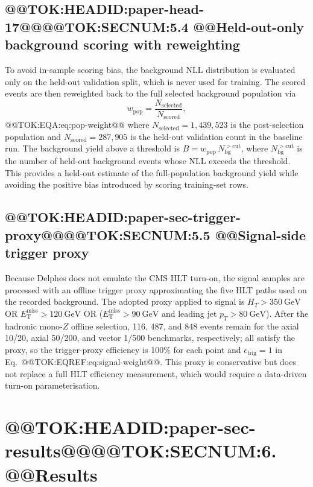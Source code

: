 \documentclass[11pt]{article}
\newcommand{\GeV}{\text{GeV}}
\newcommand{\MET}{\ensuremath{E_{\mathrm{T}}^{\mathrm{miss}}}}
\begin{document}
\subsection{@@TOK:HEADID:paper-head-17@@@@TOK:SECNUM:5.4 @@Held-out-only background scoring with reweighting}

To avoid in-sample scoring bias, the background NLL distribution is
evaluated only on the held-out validation split, which is never used for
training. The scored events are then reweighted back to the full selected
background population via
\begin{equation}
  w_{\mathrm{pop}} = \frac{N_{\mathrm{selected}}}{N_{\mathrm{scored}}},
  
\end{equation}@@TOK:EQA:eq:pop-weight@@
where $N_{\mathrm{selected}}=1{,}439{,}523$ is the post-selection population and
$N_{\mathrm{scored}}=287{,}905$ is the held-out validation count in the baseline
run. The background yield above a threshold is
$B = w_{\mathrm{pop}}\, N_{\mathrm{bg}}^{>\mathrm{cut}}$, where
$N_{\mathrm{bg}}^{>\mathrm{cut}}$ is the number of held-out background events
whose NLL exceeds the threshold. This provides a held-out estimate of the
full-population background yield while avoiding the positive bias introduced
by scoring training-set rows.

\subsection{@@TOK:HEADID:paper-sec-trigger-proxy@@@@TOK:SECNUM:5.5 @@Signal-side trigger proxy}

Because Delphes does not emulate the CMS HLT turn-on, the signal samples
are processed with an offline trigger proxy approximating the five HLT
paths used on the recorded background. The adopted proxy applied to signal
is $H_T>350~\GeV$ OR $\MET>120~\GeV$ OR ($\MET>90~\GeV$ and leading jet
$p_T>80~\GeV$). After the hadronic mono-$Z$ offline selection, 116, 487, and
848 events remain for the axial 10/20, axial 50/200, and vector 1/500
benchmarks, respectively; all satisfy the proxy, so the trigger-proxy
efficiency is 100\% for each point and $\epsilon_{\mathrm{trig}}=1$ in
Eq.~@@TOK:EQREF:eq:signal-weight@@. This proxy is conservative but does not
replace a full HLT efficiency measurement, which would require a data-driven
turn-on parameterisation.


\section{@@TOK:HEADID:paper-sec-results@@@@TOK:SECNUM:6. @@Results}
\end{document}
